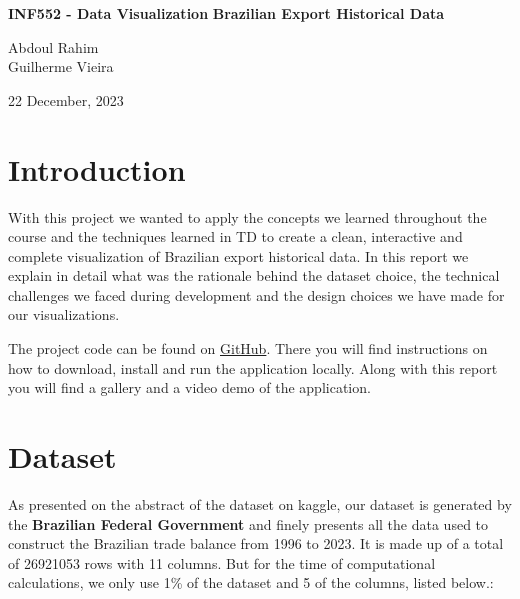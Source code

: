 \documentclass[12pt,a4]{article}
\begin{document}
\vspace*{\fill}
    \begin{center}
    
        \huge{\textbf{INF552 - Data Visualization}}
        \huge{\textbf{Brazilian Export Historical Data}}
        
        
        \vspace{3cm}
        \normalsize
        
        Abdoul Rahim\\
        Guilherme Vieira\\
 
        \vspace{1cm}
        
        22 December, 2023
       
    \end{center}

\vspace*{\fill}


\newpage

\section{Introduction}
With this project we wanted to apply the concepts we learned throughout the course and the techniques learned in TD to create a clean, interactive and complete visualization of Brazilian export historical data. In this report we explain in detail what was the rationale behind the dataset choice, the technical challenges we faced during development and the design choices we have made for our visualizations. 

The project code can be found on \href{http://www.github.com/guilevieiram/BRViz}{GitHub}. There you  will find instructions on how to download, install and run the application locally. Along with this report you will find a gallery and a video demo of the application.

\section{Dataset}
As presented on the abstract of the dataset on kaggle, our dataset is generated by the \textbf{Brazilian Federal Government} and finely presents all the data used to construct the Brazilian trade balance from 1996 to 2023. It is made up of a total of 26921053 rows with 11 columns. But for the time of computational calculations, we only use 1\% of the dataset and 5 of the columns, listed below.: 
\end{document}
